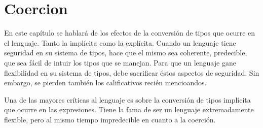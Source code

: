 \chapter{Coercion} %

\label{ch:coercion} %

En este capítulo se hablará de los efectos de la conversión de tipos que ocurre en el lenguaje. Tanto la implícita como la explícita. Cuando un lenguaje tiene seguridad en su sistema de tipos, hace que el mismo sea coherente, predecible, que sea fácil de intuir los tipos que se manejan. Para que un lenguaje gane flexibilidad en su sistema de tipos, debe sacrificar éstos aspectos de seguridad. Sin embargo, se pierden también los calificativos recién mencioandos.

Una de las mayores críticas al lenguaje es sobre la conversión de tipos implícita que ocurre en las expresiones. Tiene la fama de ser un lenguaje extremadamente flexible, pero al mismo tiempo impredecible en cuanto a la coerción.

